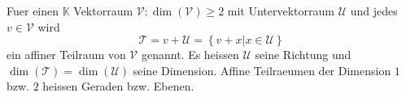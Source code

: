 Fuer einen $\mathbb{K}$ Vektorraum $\mathcal{V} : \operatorname{dim}(\mathcal{V}) \geq 2$ mit Untervektorraum $\mathcal{U}$ und jedes $v \in \mathcal{V}$ wird
$$\mathcal{T} = v + \mathcal{U} = \left\{ v + x | x \in \mathcal{U} \right\}$$ 
ein affiner Teilraum von $\mathcal{V}$ genannt. Es heissen $\mathcal{\mathcal{U}}$ seine Richtung und $\operatorname{dim}(\mathcal{T}) = \operatorname{dim}(\mathcal{U})$  seine Dimension. Affine Teilraeumen der Dimension $1$ bzw. $2$ heissen Geraden bzw. Ebenen.  
